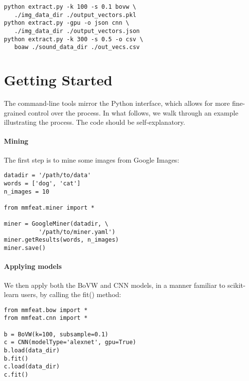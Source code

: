 \documentclass[11pt]{article}
\begin{document}
\begin{small}
\begin{verbatim}
python extract.py -k 100 -s 0.1 bovw \
   ./img_data_dir ./output_vectors.pkl
python extract.py -gpu -o json cnn \
   ./img_data_dir ./output_vectors.json
python extract.py -k 300 -s 0.5 -o csv \
   boaw ./sound_data_dir ./out_vecs.csv
\end{verbatim}
\end{small}

\section{Getting Started}

The command-line tools mirror the Python interface, which allows for more fine-grained control over the process. In what follows, we walk through an example illustrating the process. The code should be self-explanatory.

\paragraph{Mining} The first step is to mine some images from Google Images:

\begin{small}
\begin{verbatim}
datadir = '/path/to/data'
words = ['dog', 'cat']
n_images = 10

from mmfeat.miner import *

miner = GoogleMiner(datadir, \
          '/path/to/miner.yaml')
miner.getResults(words, n_images)
miner.save()
\end{verbatim}
\end{small}

\paragraph{Applying models} We then apply both the BoVW and CNN models, in a manner familiar to scikit-learn users, by calling the fit() method:

\begin{small}
\begin{verbatim}
from mmfeat.bow import *
from mmfeat.cnn import *

b = BoVW(k=100, subsample=0.1)
c = CNN(modelType='alexnet', gpu=True)
b.load(data_dir)
b.fit()
c.load(data_dir)
c.fit()
\end{verbatim}
\end{small}
\end{document}
